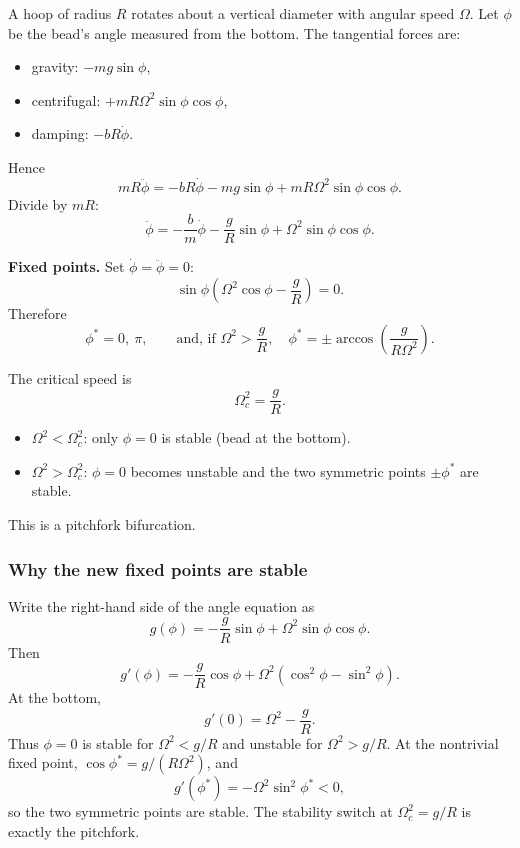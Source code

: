 \documentclass[10.5pt,a4paper]{article}
\begin{document}
A hoop of radius \(R\) rotates about a vertical diameter with angular
speed \(\Omega\). Let \(\phi\) be the bead's angle measured from the
bottom. The tangential forces are:
\begin{itemize}
\item gravity: \(-mg\sin\phi\),
\item centrifugal: \(+mR\Omega^2\sin\phi\cos\phi\),
\item damping: \(-bR\dot\phi\).
\end{itemize}
Hence
\[
mR\ddot\phi=-bR\dot\phi-mg\sin\phi+mR\Omega^2\sin\phi\cos\phi.
\]
Divide by \(mR\):
\[
\ddot\phi=-\frac{b}{m}\dot\phi-\frac{g}{R}\sin\phi
+\Omega^2\sin\phi\cos\phi.
\]

\textbf{Fixed points.} Set \(\dot\phi=\ddot\phi=0\):
\[
\sin\phi\left(\Omega^2\cos\phi-\frac{g}{R}\right)=0.
\]
Therefore
\[
\phi^*=0,\ \pi,
\qquad\text{and, if }\Omega^2>\frac{g}{R},\quad
\phi^*=\pm\arccos\!\left(\frac{g}{R\Omega^2}\right).
\]

\begin{keybox}
The critical speed is
\[
\Omega_c^2=\frac{g}{R}.
\]
\begin{itemize}
\item \(\Omega^2<\Omega_c^2\): only \(\phi=0\) is stable (bead at the bottom).
\item \(\Omega^2>\Omega_c^2\): \(\phi=0\) becomes unstable and the two symmetric
points \(\pm\phi^*\) are stable.
\end{itemize}
This is a pitchfork bifurcation.
\end{keybox}

\subsubsection*{Why the new fixed points are stable}

Write the right-hand side of the angle equation as
\[
g(\phi)=-\frac{g}{R}\sin\phi+\Omega^2\sin\phi\cos\phi.
\]
Then
\[
g'(\phi)=-\frac{g}{R}\cos\phi
+\Omega^2(\cos^2\phi-\sin^2\phi).
\]
At the bottom,
\[
g'(0)=\Omega^2-\frac{g}{R}.
\]
Thus \(\phi=0\) is stable for \(\Omega^2<g/R\) and unstable for
\(\Omega^2>g/R\).
At the nontrivial fixed point, \(\cos\phi^*=g/(R\Omega^2)\), and
\[
g'(\phi^*)=-\Omega^2\sin^2\phi^*<0,
\]
so the two symmetric points are stable. The stability switch at
\(\Omega_c^2=g/R\) is exactly the pitchfork.

\begin{center}
\end{center}
\end{document}
